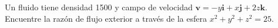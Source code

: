 \item Un fluido tiene densidad 1500 y campo de velocidad $\mathbf{v} = -y\mathbf{i} + x\mathbf{j} + 2z\mathbf{k}$. Encuentre la razón de flujo exterior a través de la esfera $x^2 + y^2 + z^2 = 25$.
